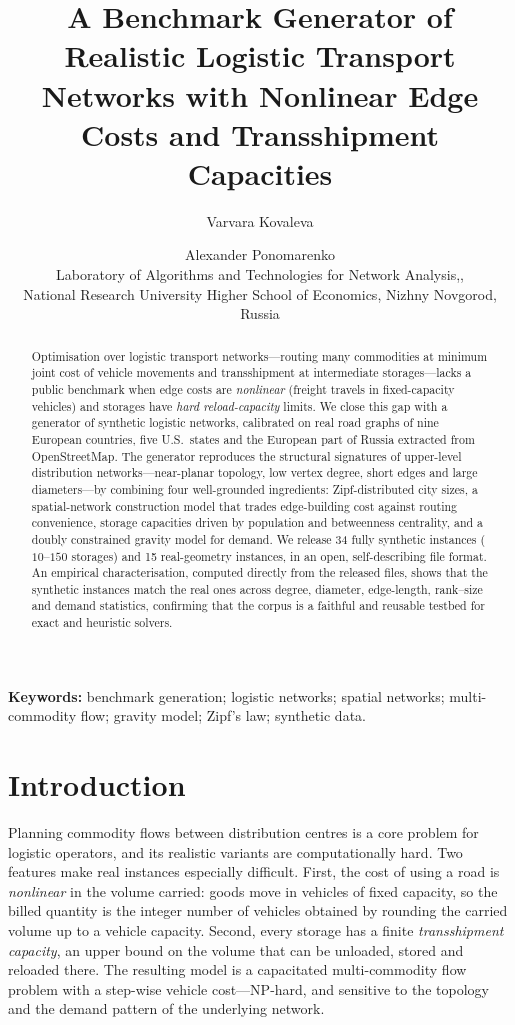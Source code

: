 \documentclass[11pt]{article}
\title{\textbf{A Benchmark Generator of Realistic Logistic Transport Networks
with Nonlinear Edge Costs and Transshipment Capacities}}
\author{Varvara Kovaleva \and Alexander Ponomarenko\\[2pt]
\small Laboratory of Algorithms and Technologies for Network Analysis,,\\
\small National Research University Higher School of Economics, Nizhny Novgorod, Russia}
\date{}
\begin{document}
\maketitle

\begin{abstract}
\noindent
Optimisation over logistic transport networks---routing many commodities at
minimum joint cost of vehicle movements and transshipment at intermediate
storages---lacks a public benchmark when edge costs are \emph{nonlinear}
(freight travels in fixed-capacity vehicles) and storages have \emph{hard
reload-capacity} limits. We close this gap with a generator of synthetic
logistic networks, calibrated on real road graphs of nine European countries,
five U.S.\ states and the European part of Russia extracted from
OpenStreetMap. The generator reproduces the structural signatures of
upper-level distribution networks---near-planar topology, low vertex degree,
short edges and large diameters---by combining four well-grounded ingredients:
Zipf-distributed city sizes, a spatial-network construction model that trades
edge-building cost against routing convenience, storage capacities driven by
population and betweenness centrality, and a doubly constrained gravity model
for demand. We release 34 fully synthetic instances ($10$--$150$ storages) and
15 real-geometry instances, in an open, self-describing file format. An
empirical characterisation, computed directly from the released files, shows
that the synthetic instances match the real ones across degree, diameter,
edge-length, rank--size and demand statistics, confirming that the corpus is a
faithful and reusable testbed for exact and heuristic solvers.
\end{abstract}

\noindent\textbf{Keywords:} benchmark generation; logistic networks; spatial
networks; multi-commodity flow; gravity model; Zipf's law; synthetic data.

\section{Introduction}

Planning commodity flows between distribution centres is a core problem for
logistic operators, and its realistic variants are computationally hard. Two
features make real instances especially difficult. First, the cost of using a
road is \emph{nonlinear} in the volume carried: goods move in vehicles of fixed
capacity, so the billed quantity is the integer number of vehicles obtained by
rounding the carried volume up to a vehicle capacity. Second, every storage has
a finite \emph{transshipment capacity}, an upper bound on the volume that can be
unloaded, stored and reloaded there. The resulting model is a capacitated
multi-commodity flow problem with a step-wise vehicle cost---NP-hard, and
sensitive to the topology and the demand pattern of the underlying network.
\end{document}

